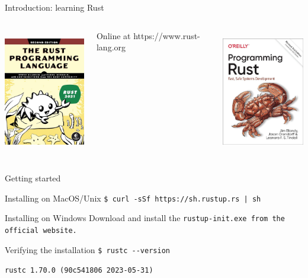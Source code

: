     \begin{frame}{Introduction: learning Rust}
        \begin{columns}[t, onlytextwidth]
            \centering
            \includegraphics[height=5.5cm, keepaspectratio]{images/rust-book.jpg}

            \small Online at https://www.rust-lang.org

            \centering
            \includegraphics[height=5.5cm, keepaspectratio]{images/programming-rust.jpg}
        \end{columns}
    \end{frame}

    \begin{frame}[containsverbatim]{Getting started}
        \small
        \begin{block}{Installing on MacOS/Unix}
            \tt{\$ curl -sSf https://sh.rustup.rs | sh}
        \end{block}

        \begin{block}{Installing on Windows}
            Download and install the \tt{rustup-init.exe} from the official website. 
        \end{block}

        \begin{alertblock}{Verifying the installation}
            \tt{\$ rustc -{}-version}
            
            \tt{rustc 1.70.0 (90c541806 2023-05-31)}
        \end{alertblock}
    \end{frame}

